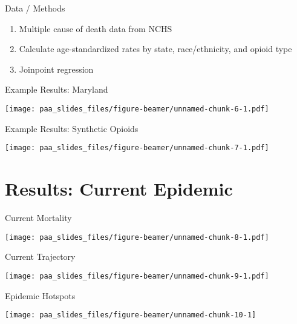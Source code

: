 \documentclass[ignorenonframetext,compress]{beamer}
\providecommand{\tightlist}{%
  \setlength{\itemsep}{0pt}\setlength{\parskip}{0pt}}
\begin{document}
\begin{frame}{Data / Methods}

\begin{enumerate}[<+->]
\def\labelenumi{\arabic{enumi}.}
\tightlist
\item
  Multiple cause of death data from NCHS
\item
  Calculate age-standardized rates by state, race/ethnicity, and opioid
  type
\item
  Joinpoint regression
\end{enumerate}

\end{frame}

\begin{frame}{Example Results: Maryland}

\texttt{[image: paa\_slides\_files/figure-beamer/unnamed-chunk-6-1.pdf]}

\end{frame}

\begin{frame}{Example Results: Synthetic Opioids}

\texttt{[image: paa\_slides\_files/figure-beamer/unnamed-chunk-7-1.pdf]}

\end{frame}

\section{Results: Current Epidemic}\label{results-current-epidemic}

\begin{frame}{Current Mortality}

\texttt{[image: paa\_slides\_files/figure-beamer/unnamed-chunk-8-1.pdf]}

\end{frame}

\begin{frame}{Current Trajectory}

\texttt{[image: paa\_slides\_files/figure-beamer/unnamed-chunk-9-1.pdf]}

\end{frame}

\begin{frame}{Epidemic Hotspots}

\begin{center}\texttt{[image: paa\_slides\_files/figure-beamer/unnamed-chunk-10-1]} \end{center}

\end{frame}
\end{document}
